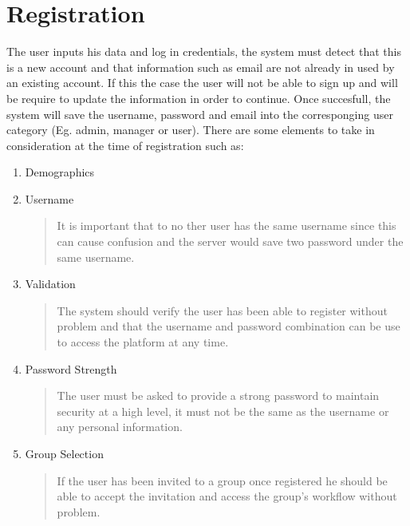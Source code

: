 \documentclass{article}[draft]
\begin{document}
\section{Registration}
The user inputs his data and log in credentials, the system must detect that this is a new account and that information such as email are not already in used by an existing account. If this the case the user will not be able to sign up and will be require to update the information in order to continue. Once succesfull, the system will save the username, password and email into the corresponging user category (Eg. admin, manager or user). There are some elements to take in consideration at the time of registration such as:
\begin{enumerate}
  \item Demographics

  \item Username
  \begin{quote}
    It is important that to no ther user has the same username since this can cause confusion and the server would save two password under the same username.
  \end{quote}

  \item Validation
  \begin{quote}
    The system should verify the user has been able to register without problem and that the username and password combination can be use to access the platform at any time.
  \end{quote}

  \item Password Strength
  \begin{quote}
    The user must be asked to provide a strong password to maintain security at a high level, it must not be the same as the username or any personal information.
  \end{quote}

  \item Group Selection
  \begin{quote}
    If the user has been invited to a group once registered he should be able to accept the invitation and access the group's workflow without problem.
  \end{quote}
\end{enumerate}
\end{document}
